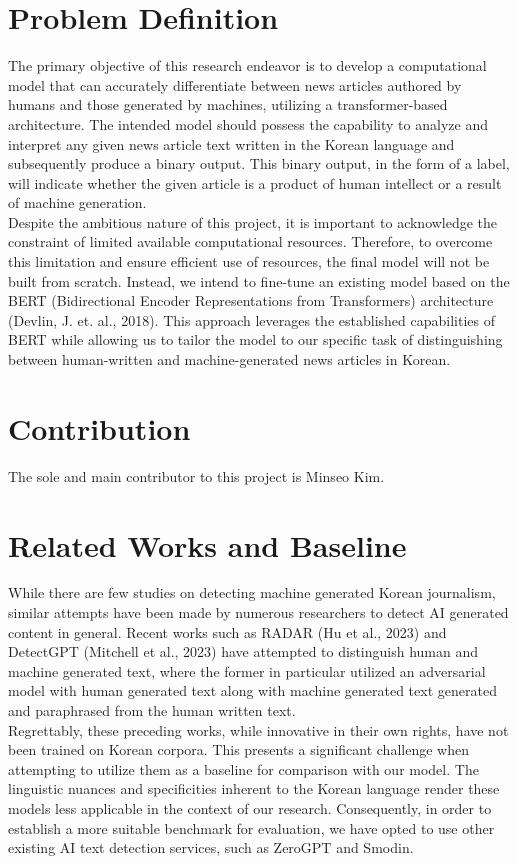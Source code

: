 \documentclass{article}
\begin{document}
\section{Problem Definition}
\null\quad The primary objective of this research endeavor is to develop a computational model that can accurately differentiate between news articles authored by humans and those generated by machines, utilizing a transformer-based architecture.
The intended model should possess the capability to analyze and interpret any given news article text written in the Korean language and subsequently produce a binary output.
This binary output, in the form of a label, will indicate whether the given article is a product of human intellect or a result of machine generation. \\
\null\quad Despite the ambitious nature of this project, it is important to acknowledge the constraint of limited available computational resources.
Therefore, to overcome this limitation and ensure efficient use of resources, the final model will not be built from scratch.
Instead, we intend to fine-tune an existing model based on the BERT (Bidirectional Encoder Representations from Transformers) architecture (Devlin, J. et. al., 2018).
This approach leverages the established capabilities of BERT while allowing us to tailor the model to our specific task of distinguishing between human-written and machine-generated news articles in Korean.

\section{Contribution}
\null\quad The sole and main contributor to this project is Minseo Kim.

\section{Related Works and Baseline}
\null\quad While there are few studies on detecting machine generated Korean journalism, similar attempts have been made by numerous researchers to detect AI generated content in general.
Recent works such as RADAR (Hu et al., 2023) and DetectGPT (Mitchell et al., 2023) have attempted to distinguish human and machine generated text,
where the former in particular utilized an adversarial model with human generated text along with machine generated text generated and paraphrased from the human written text. \\
\null\quad Regrettably, these preceding works, while innovative in their own rights, have not been trained on Korean corpora.
This presents a significant challenge when attempting to utilize them as a baseline for comparison with our model.
The linguistic nuances and specificities inherent to the Korean language render these models less applicable in the context of our research.
Consequently, in order to establish a more suitable benchmark for evaluation, we have opted to use other existing AI text detection services, such as ZeroGPT and Smodin.
\end{document}
